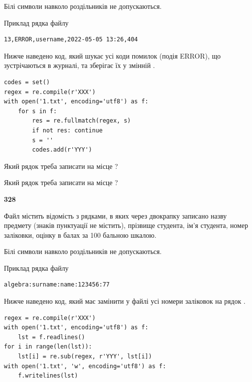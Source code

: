 Білі символи навколо роздільників не допускаються.

Приклад рядка файлу



\begin{verbatim}
13,ERROR,username,2022-05-05 13:26,404
\end{verbatim}


Нижче наведено код, який шукає усі коди помилок (подія ERROR), що зустріча\-ють\-ся в журналі, та зберігає їх у змінній .



\begin{verbatim}
codes = set()
regex = re.compile(r'XXX')
with open('1.txt', encoding='utf8') as f:
    for s in f:
        res = re.fullmatch(regex, s)
        if not res: continue
        s = ''
        codes.add(r'YYY')
\end{verbatim}





Який рядок треба записати на місце  ?\par
\vspace{5mm}


Який рядок треба записати на місце  ?\par


\newpage

{\begin {center}\textbf{ 328}\end {center}}\par
Файл  містить відомість з рядками, в яких через двокрапку записа\-но назву предмету (знаків пунктуації не містить), прізвище студента, ім'я студента, номер залі\-ков\-ки, оцінку в балах за 100 бальною шкалою.

Білі символи навколо роздільників не допускаються.

Приклад рядка файлу



\begin{verbatim}
algebra:surname:name:123456:77
\end{verbatim}


Нижче наведено код, який має замінити у файлі усі номери заліковок на рядок \code{***}.



\begin{verbatim}
regex = re.compile(r'XXX')
with open('1.txt', encoding='utf8') as f:
    lst = f.readlines()
for i in range(len(lst)):
    lst[i] = re.sub(regex, r'YYY', lst[i])
with open('1.txt', 'w', encoding='utf8') as f:
    f.writelines(lst)
\end{verbatim}







